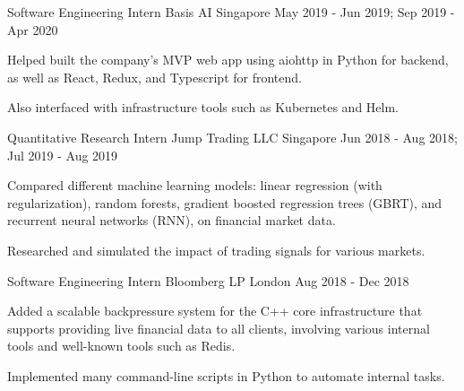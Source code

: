 

\begin{cventries}

  \cventry
  {Software Engineering Intern} %
  {Basis AI} %
  {Singapore} %
  {May 2019 - Jun 2019; Sep 2019 - Apr 2020} %
  {
    \begin{cvitems} %
    \item {Helped built the company's MVP web app using aiohttp in Python for backend, as well as React, Redux, and Typescript for frontend.}
    \item {Also interfaced with infrastructure tools such as Kubernetes and Helm.}
    \end{cvitems}
  }

  \cventry
  {Quantitative Research Intern} %
  {Jump Trading LLC} %
  {Singapore} %
  {Jun 2018 - Aug 2018; Jul 2019 - Aug 2019} %
  {
    \begin{cvitems} %
    \item {Compared different machine learning models: linear regression (with regularization), random forests, gradient boosted regression trees (GBRT), and recurrent neural networks (RNN), on financial market data.}
    \item {Researched and simulated the impact of trading signals for various markets.}
    \end{cvitems}
  }

  \cventry
  {Software Engineering Intern} %
  {Bloomberg LP} %
  {London} %
  {Aug 2018 - Dec 2018} %
  {
    \begin{cvitems} %
    \item {Added a scalable backpressure system for the C++ core infrastructure that supports providing live financial data to all clients, involving various internal tools and well-known tools such as Redis.}
    \item {Implemented many command-line scripts in Python to automate internal tasks.}
    \end{cvitems}
  }


\end{cventries}
